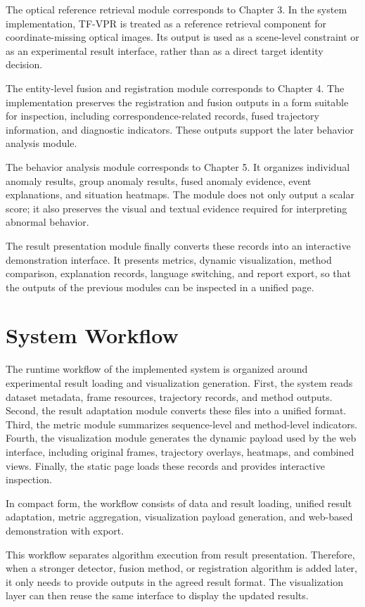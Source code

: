 The optical reference retrieval module corresponds to Chapter 3. In the system implementation, TF-VPR is treated as a reference retrieval component for coordinate-missing optical images. Its output is used as a scene-level constraint or as an experimental result interface, rather than as a direct target identity decision.

The entity-level fusion and registration module corresponds to Chapter 4. The implementation preserves the registration and fusion outputs in a form suitable for inspection, including correspondence-related records, fused trajectory information, and diagnostic indicators. These outputs support the later behavior analysis module.

The behavior analysis module corresponds to Chapter 5. It organizes individual anomaly results, group anomaly results, fused anomaly evidence, event explanations, and situation heatmaps. The module does not only output a scalar score; it also preserves the visual and textual evidence required for interpreting abnormal behavior.

The result presentation module finally converts these records into an interactive demonstration interface. It presents metrics, dynamic visualization, method comparison, explanation records, language switching, and report export, so that the outputs of the previous modules can be inspected in a unified page.

\section{System Workflow}
The runtime workflow of the implemented system is organized around experimental result loading and visualization generation. First, the system reads dataset metadata, frame resources, trajectory records, and method outputs. Second, the result adaptation module converts these files into a unified format. Third, the metric module summarizes sequence-level and method-level indicators. Fourth, the visualization module generates the dynamic payload used by the web interface, including original frames, trajectory overlays, heatmaps, and combined views. Finally, the static page loads these records and provides interactive inspection.

In compact form, the workflow consists of data and result loading, unified result adaptation, metric aggregation, visualization payload generation, and web-based demonstration with export.

This workflow separates algorithm execution from result presentation. Therefore, when a stronger detector, fusion method, or registration algorithm is added later, it only needs to provide outputs in the agreed result format. The visualization layer can then reuse the same interface to display the updated results.

